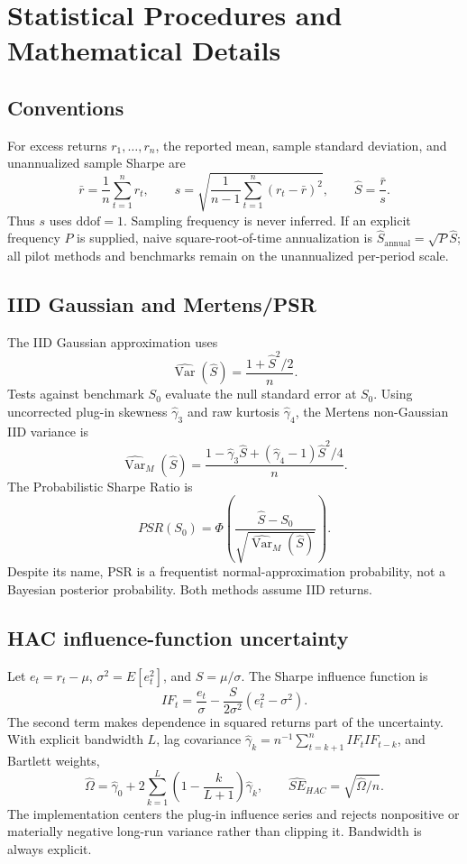\section{Statistical Procedures and Mathematical Details}
\label{supp:methods}

\subsection{Conventions}

For excess returns \(r_1,\ldots,r_n\), the reported mean, sample standard
deviation, and unannualized sample Sharpe are
\[
\bar r=\frac{1}{n}\sum_{t=1}^n r_t,\qquad
s=\sqrt{\frac{1}{n-1}\sum_{t=1}^n(r_t-\bar r)^2},\qquad
\widehat S=\frac{\bar r}{s}.
\]
Thus \(s\) uses \(\mathrm{ddof}=1\).  Sampling frequency is never inferred.
If an explicit frequency \(P\) is supplied, naive square-root-of-time
annualization is \(\widehat S_{\mathrm{annual}}=\sqrt{P}\widehat S\); all
pilot methods and benchmarks remain on the unannualized per-period scale.

\subsection{IID Gaussian and Mertens/PSR}

The IID Gaussian approximation uses
\[
\widehat{\operatorname{Var}}(\widehat S)
=\frac{1+\widehat S^2/2}{n}.
\]
Tests against benchmark \(S_0\) evaluate the null standard error at \(S_0\).
Using uncorrected plug-in skewness \(\widehat\gamma_3\) and raw kurtosis
\(\widehat\gamma_4\), the Mertens non-Gaussian IID variance is
\[
\widehat{\operatorname{Var}}_M(\widehat S)
=\frac{1-\widehat\gamma_3\widehat S+
(\widehat\gamma_4-1)\widehat S^2/4}{n}.
\]
The Probabilistic Sharpe Ratio is
\[
PSR(S_0)=\Phi\!\left(
\frac{\widehat S-S_0}
{\sqrt{\widehat{\operatorname{Var}}_M(\widehat S)}}\right).
\]
Despite its name, PSR is a frequentist normal-approximation probability, not
a Bayesian posterior probability.  Both methods assume IID returns.

\subsection{HAC influence-function uncertainty}

Let \(e_t=r_t-\mu\), \(\sigma^2=E[e_t^2]\), and \(S=\mu/\sigma\).  The Sharpe
influence function is
\[
IF_t=\frac{e_t}{\sigma}
-\frac{S}{2\sigma^2}(e_t^2-\sigma^2).
\]
The second term makes dependence in squared returns part of the uncertainty.
With explicit bandwidth \(L\), lag covariance
\(\widehat\gamma_k=n^{-1}\sum_{t=k+1}^n IF_tIF_{t-k}\), and Bartlett weights,
\[
\widehat\Omega=\widehat\gamma_0+
2\sum_{k=1}^L\left(1-\frac{k}{L+1}\right)\widehat\gamma_k,\qquad
\widehat{SE}_{HAC}=\sqrt{\widehat\Omega/n}.
\]
The implementation centers the plug-in influence series and rejects
nonpositive or materially negative long-run variance rather than clipping it.
Bandwidth is always explicit.

